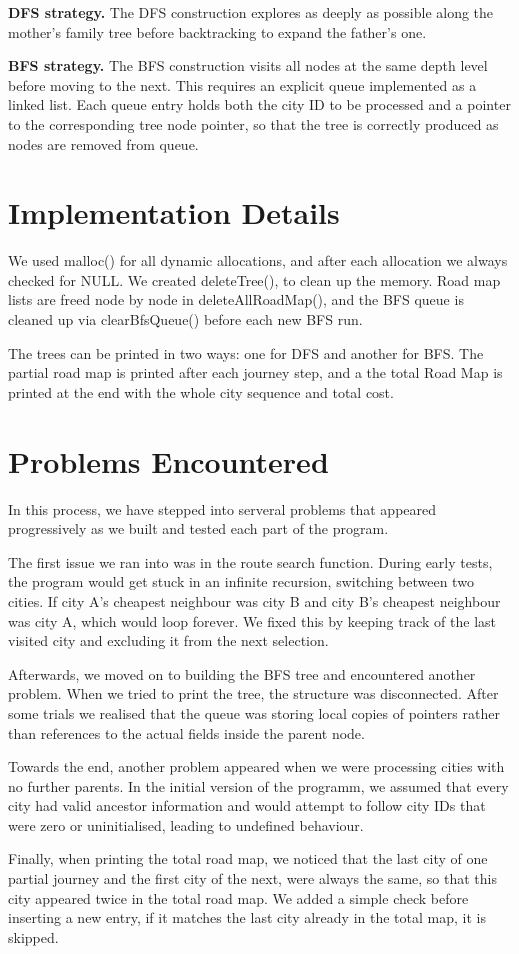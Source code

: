 \documentclass[12pt,a4paper]{article}
\begin{document}
\textbf{DFS strategy.} The DFS construction explores as deeply as possible along the mother's family tree before backtracking to expand the father's one. 

\textbf{BFS strategy.} The BFS construction visits all nodes at the same depth level before moving to the next. This requires an explicit queue implemented as a linked list. Each queue entry holds both the city ID to be processed and a pointer to the corresponding tree node pointer, so that the tree is correctly produced as nodes are removed from queue. 

\section*{Implementation Details}

We used malloc() for all dynamic allocations, and after each allocation we always checked for NULL. We created deleteTree(), to clean up the memory. Road map lists are freed node by node in deleteAllRoadMap(), and the BFS queue is cleaned up via clearBfsQueue() before each new BFS run.

The trees can be printed in two ways: one for DFS and another for BFS. The partial road map is printed after each journey step, and a the total Road Map is printed at the end with the whole city sequence and total cost.

\section*{Problems Encountered}
 
In this process, we have stepped into serveral problems that appeared progressively as we built and tested each part of the program.
 
The first issue we ran into was in the route search function. During early tests, the program would get stuck in an infinite recursion, switching between two cities. If city A's cheapest neighbour was city B and city B's cheapest neighbour was city A, which would loop forever. We fixed this by keeping track of the last visited city and excluding it from the next selection.
 
Afterwards, we moved on to building the BFS tree and encountered another problem. When we tried to print the tree, the structure was disconnected. After some trials we realised that the queue was storing local copies of pointers rather than references to the actual fields inside the parent node. 
 
Towards the end, another problem appeared when we were processing cities with no further parents. In the initial version of the programm, we assumed that every city had valid ancestor information and would attempt to follow city IDs that were zero or uninitialised, leading to undefined behaviour. 
 
Finally, when printing the total road map, we noticed that the last city of one partial journey and the first city of the next, were always the same, so that this city appeared twice in the total road map. We added a simple check before inserting a new entry, if it matches the last city already in the total map, it is skipped.
 
\end{document}

